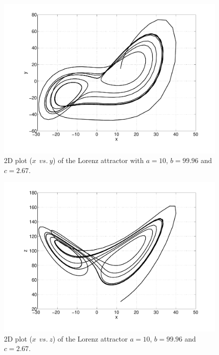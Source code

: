 \begin{multicols}{2}

\begin{figure}[H]
\centering
\includegraphics[scale=0.3, trim = 20mm 0mm 0mm 0mm, clip]
{./Figures/2-CauchyProblem/lorentz_xy2.pdf}
\caption{2D plot ($x \:\: vs. \: y$) of the Lorenz attractor with $a=10$,
$b=99.96$ and $c=2.67$.}
\end{figure}

\columnbreak

\begin{figure}[H]
\centering
\includegraphics[scale=0.3, trim = 20mm 0mm 0mm 0mm, clip]
{./Figures/2-CauchyProblem/lorentz_xz2.pdf}
\caption{2D plot ($x \:\: vs. \: z$) of the Lorenz attractor $a=10$,
$b=99.96$ and $c=2.67$.}
\end{figure}

\end{multicols}

